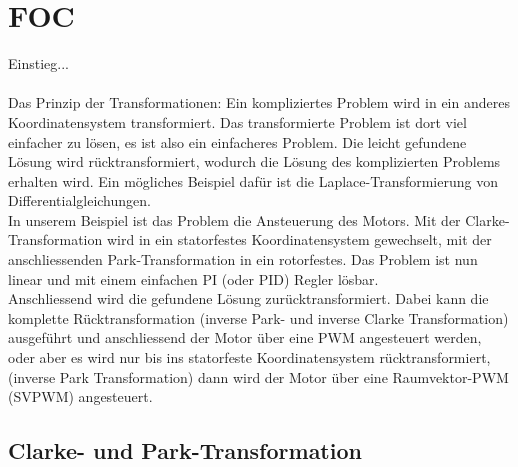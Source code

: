 \section{FOC}
\label{tGl_FOC}
Einstieg...\\
\\
Das Prinzip der Transformationen:
Ein kompliziertes Problem wird in ein anderes Koordinatensystem transformiert. Das transformierte Problem ist dort viel einfacher zu lösen, es ist also ein einfacheres Problem. Die leicht gefundene Lösung wird rücktransformiert, wodurch die Lösung des komplizierten Problems erhalten wird. Ein mögliches Beispiel dafür ist die Laplace-Transformierung von Differentialgleichungen. 
\\
In unserem Beispiel ist das Problem die Ansteuerung des Motors. Mit der Clarke-Transformation wird in ein statorfestes Koordinatensystem gewechselt, mit der anschliessenden Park-Transformation in ein rotorfestes. Das Problem ist nun linear und mit einem einfachen PI (oder PID) Regler lösbar. \\
Anschliessend wird die gefundene Lösung zurücktransformiert. Dabei kann die komplette Rücktransformation (inverse Park- und inverse Clarke Transformation) ausgeführt und anschliessend der Motor über eine PWM angesteuert werden, oder aber es wird nur bis ins statorfeste Koordinatensystem rücktransformiert, (inverse Park Transformation) dann wird der Motor über eine Raumvektor-PWM (SVPWM) angesteuert.


\subsection*{Clarke- und Park-Transformation}
